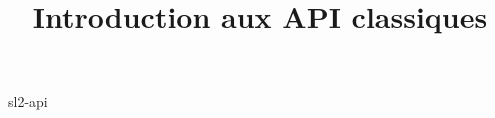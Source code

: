 \documentclass {beamer}
\title {Introduction aux API classiques}
\begin{document}
 {sl2-api}
\end{document}
